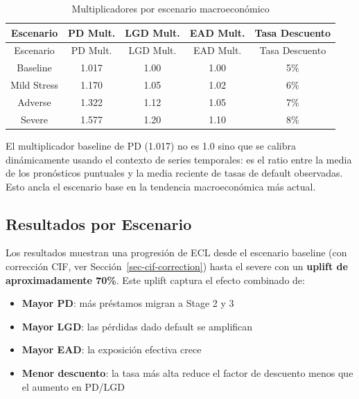 \documentclass[
  spanish,
  11pt,
  letterpaper,
]{scrbook}
\providecommand{\tightlist}{%
  \setlength{\itemsep}{0pt}\setlength{\parskip}{0pt}}
\theoremstyle{plain}
\theoremstyle{remark}
\begin{document}
\begin{longtable}[]{@{}ccccc@{}}
\caption{Multiplicadores por escenario
macroeconómico}\label{tbl-scenario-multipliers}\tabularnewline
\toprule\noalign{}
Escenario & PD Mult. & LGD Mult. & EAD Mult. & Tasa Descuento \\
\midrule\noalign{}
\endfirsthead
\toprule\noalign{}
Escenario & PD Mult. & LGD Mult. & EAD Mult. & Tasa Descuento \\
\midrule\noalign{}
\endhead
\bottomrule\noalign{}
\endlastfoot
Baseline & 1.017 & 1.00 & 1.00 & 5\% \\
Mild Stress & 1.170 & 1.05 & 1.02 & 6\% \\
Adverse & 1.322 & 1.12 & 1.05 & 7\% \\
Severe & 1.577 & 1.20 & 1.10 & 8\% \\
\end{longtable}

\begin{tcolorbox}[enhanced jigsaw, arc=.35mm, bottomrule=.15mm, bottomtitle=1mm, breakable, colback=white, colbacktitle=quarto-callout-note-color!10!white, colframe=quarto-callout-note-color-frame, coltitle=black, left=2mm, leftrule=.75mm, opacityback=0, opacitybacktitle=0.6, rightrule=.15mm, title=\textcolor{quarto-callout-note-color}{\faInfo}\hspace{0.5em}{Calibración Temporal del Baseline}, titlerule=0mm, toprule=.15mm, toptitle=1mm]

El multiplicador baseline de PD (1.017) no es 1.0 sino que se calibra
dinámicamente usando el contexto de series temporales: es el ratio entre
la media de los pronósticos puntuales y la media reciente de tasas de
default observadas. Esto ancla el escenario base en la tendencia
macroeconómica más actual.

\end{tcolorbox}

\subsection{Resultados por Escenario}\label{resultados-por-escenario}

Los resultados muestran una progresión de ECL desde el escenario
baseline (con corrección CIF, ver Sección~\ref{sec-cif-correction})
hasta el severe con un \textbf{uplift de aproximadamente 70\%}. Este
uplift captura el efecto combinado de:

\begin{itemize}
\tightlist
\item
  \textbf{Mayor PD}: más préstamos migran a Stage 2 y 3
\item
  \textbf{Mayor LGD}: las pérdidas dado default se amplifican
\item
  \textbf{Mayor EAD}: la exposición efectiva crece
\item
  \textbf{Menor descuento}: la tasa más alta reduce el factor de
  descuento menos que el aumento en PD/LGD
\end{itemize}
\end{document}
